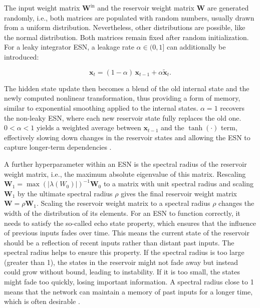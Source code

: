The input weight matrix \(\mathbf{W}^{\mathrm{in}}\) and the reservoir weight matrix \(\mathbf{W}\) are generated randomly, i.e., both matrices are populated with random numbers, usually drawn from a uniform distribution. Nevertheless, other distributions are possible, like the normal distribution. Both matrices remain fixed after random initialization. For a leaky integrator ESN, a leakage rate \(\alpha \in (0,1]\) can additionally be introduced:

\begin{equation}
\mathbf{x}_t = (1 - \alpha)\,\mathbf{x}_{t-1} + \alpha \tilde{\mathbf{x}}_t.
\label{eq:leaky-reservoir}
\end{equation}

The hidden state update then becomes a blend of the old internal state and the newly computed nonlinear transformation, thus providing a form of memory, similar to exponential smoothing applied to the internal states. \(\alpha = 1\) recovers the non-leaky ESN, where each new reservoir state fully replaces the old one. \(0 < \alpha < 1\) yields a weighted average between \(\mathbf{x}_{t-1}\) and the \(\tanh(\cdot)\) term, effectively slowing down changes in the reservoir states and allowing the ESN to capture longer-term dependencies \citep{Lukosevicius2012}.

A further hyperparameter within an ESN is the spectral radius of the reservoir weight matrix, i.e., the maximum absolute eigenvalue of this matrix. Rescaling \(\mathbf{W}_1 = {\max(|\lambda(W_0)|)}^{-1} \mathbf{W}_0\) to a matrix with unit spectral radius and scaling \(\mathbf{W}_1\) by the ultimate spectral radius \(\rho\) gives the final reservoir weight matrix \(\mathbf{W} = \rho \mathbf{W}_1\). Scaling the reservoir weight matrix to a spectral radius \(\rho\) changes the width of the distribution of its elements. For an ESN to function correctly, it needs to satisfy the so-called echo state property, which ensures that the influence of previous inputs fades over time. This means the current state of the reservoir should be a reflection of recent inputs rather than distant past inputs. The spectral radius helps to ensure this property. If the spectral radius is too large (greater than 1), the states in the reservoir might not fade away but instead could grow without bound, leading to instability. If it is too small, the states might fade too quickly, losing important information. A spectral radius close to 1 means that the network can maintain a memory of past inputs for a longer time, which is often desirable \citep{Lukosevicius2012}.

